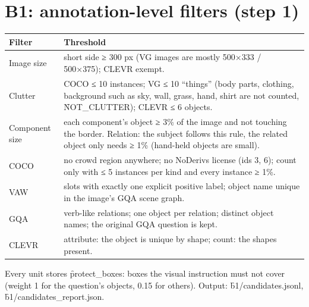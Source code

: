 \documentclass[10.5pt]{article}
\begin{document}
\section{B1: annotation-level filters (step 1)}
\begin{longtable}{p{3.4cm}p{12.6cm}}
\toprule
\textbf{Filter} & \textbf{Threshold}\\
\midrule
Image size & short side ≥ 300 px (VG images are mostly 500×333 / 500×375); CLEVR exempt.\\
Clutter & COCO ≤ 10 instances; VG ≤ 10 ``things'' (body parts, clothing, background such as sky, wall, grass,
  hand, shirt are not counted, \f{NOT\_CLUTTER}); CLEVR ≤ 6 objects.\\
Component size & each component's object ≥ 3\% of the image and not touching the border. Relation: the subject
  follows this rule, the related object only needs ≥ 1\% (hand-held objects are small).\\
COCO & no crowd region anywhere; no NoDerivs license (ids 3, 6); count only with ≤ 5 instances per kind and every
  instance ≥ 1\%.\\
VAW & slots with exactly one explicit positive label; object name unique in the image's GQA scene graph.\\
GQA & verb-like relations; one object per relation; distinct object names; the original GQA question is kept.\\
CLEVR & attribute: the object is unique by shape; count: the shapes present.\\
\bottomrule
\end{longtable}
Every unit stores \f{protect\_boxes}: boxes the visual instruction must not cover (weight 1 for the question's
objects, 0.15 for others). Output: \f{b1/candidates.jsonl}, \f{b1/candidates\_report.json}.
\end{document}
